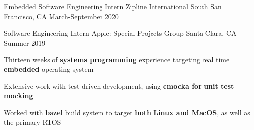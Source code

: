 

\begin{cventries}

  
  \cventry
    {Embedded Software Engineering Intern} %
    {Zipline International} %
    {South San Francisco, CA} %
    {March-September 2020} %
    {
      \begin{cvitems} %
      \end{cvitems}
    }

  \cventry
    {Software Engineering Intern} %
    {Apple: Special Projects Group} %
    {Santa Clara, CA} %
    {Summer 2019} %
    {
      \begin{cvitems} %
      \item {Thirteen weeks of \textbf{systems programming} experience targeting real time \textbf{embedded} operating system}
      \item {Extensive work with test driven development, using \textbf{cmocka for unit test mocking}}
      \item {Worked with \textbf{bazel} build system to target \textbf{both Linux and MacOS}, as well as the primary RTOS}
      \end{cvitems}
    }

  



\end{cventries}
